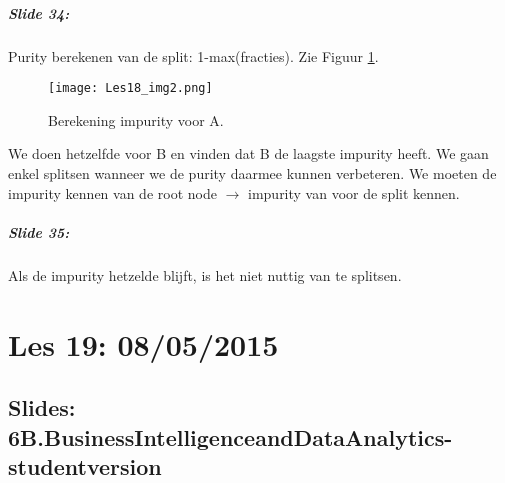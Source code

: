 \documentclass[10pt,a4paper]{report}
\begin{document}
\paragraph{Slide 34:}Purity berekenen van de split: 1-max(fracties). Zie Figuur \ref{18_2}.

\begin{figure}[ht!]
\centering
\texttt{[image: Les18\_img2.png]}
\caption{Berekening impurity voor A. \label{18_2}}
\end{figure}

We doen hetzelfde voor B en vinden dat B de laagste impurity heeft. We gaan enkel splitsen wanneer we de purity daarmee kunnen verbeteren. We moeten de impurity kennen van de root node $\rightarrow$ impurity van voor de split kennen.

\paragraph{Slide 35:}Als de impurity hetzelde blijft, is het niet nuttig van te splitsen.

\chapter{Les 19: 08/05/2015}
\section{Slides:  6B.BusinessIntelligenceandDataAnalytics-studentversion}
\end{document}
